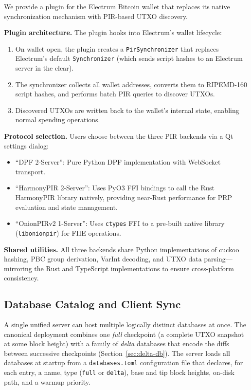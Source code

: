We provide a plugin for the Electrum Bitcoin wallet \cite{electrum} that replaces its native synchronization mechanism with PIR-based UTXO discovery.

\textbf{Plugin architecture.} The plugin hooks into Electrum's wallet lifecycle:
\begin{enumerate}[nolistsep,leftmargin=*]
    \item On wallet open, the plugin creates a \texttt{PirSynchronizer} that replaces Electrum's default \texttt{Synchronizer} (which sends script hashes to an Electrum server in the clear).
    \item The synchronizer collects all wallet addresses, converts them to RIPEMD-160 script hashes, and performs batch PIR queries to discover UTXOs.
    \item Discovered UTXOs are written back to the wallet's internal state, enabling normal spending operations.
\end{enumerate}

\textbf{Protocol selection.} Users choose between the three PIR backends via a Qt settings dialog:
\begin{itemize}[nolistsep,leftmargin=*]
    \item ``DPF 2-Server'': Pure Python DPF implementation with WebSocket transport.
    \item ``HarmonyPIR 2-Server'': Uses PyO3 FFI bindings to call the Rust HarmonyPIR library natively, providing near-Rust performance for PRP evaluation and state management.
    \item ``OnionPIRv2 1-Server'': Uses \texttt{ctypes} FFI to a pre-built native library (\texttt{libonionpir}) for FHE operations.
\end{itemize}

\textbf{Shared utilities.} All three backends share Python implementations of cuckoo hashing, PBC group derivation, VarInt decoding, and UTXO data parsing---mirroring the Rust and TypeScript implementations to ensure cross-platform consistency.

\subsection{Database Catalog and Client Sync}
\label{sec:deployment-catalog}

A single unified server can host multiple logically distinct databases at once. The canonical deployment combines one \emph{full} checkpoint (a complete UTXO snapshot at some block height) with a family of \emph{delta} databases that encode the diffs between successive checkpoints (Section~\ref{sec:delta-db}). The server loads all databases at startup from a \texttt{databases.toml} configuration file that declares, for each entry, a name, type (\texttt{full} or \texttt{delta}), base and tip block heights, on-disk path, and a warmup priority.

